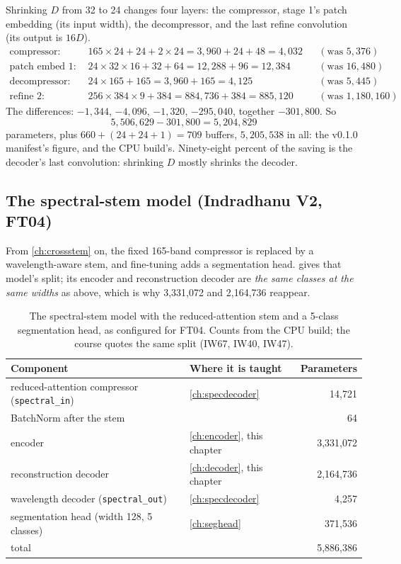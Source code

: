 Shrinking $D$ from 32 to 24 changes four layers: the compressor, stage 1's patch embedding (its input
width), the decompressor, and the last refine convolution (its output is $16D$).
\begin{align*}
\text{compressor:}\quad & 165 \times 24 + 24 + 2 \times 24 = 3{,}960 + 24 + 48 = 4{,}032 && (\text{was } 5{,}376)\\
\text{patch embed 1:}\quad & 24 \times 32 \times 16 + 32 + 64 = 12{,}288 + 96 = 12{,}384 && (\text{was } 16{,}480)\\
\text{decompressor:}\quad & 24 \times 165 + 165 = 3{,}960 + 165 = 4{,}125 && (\text{was } 5{,}445)\\
\text{refine 2:}\quad & 256 \times 384 \times 9 + 384 = 884{,}736 + 384 = 885{,}120 && (\text{was } 1{,}180{,}160)
\end{align*}
The differences: $-1{,}344$, $-4{,}096$, $-1{,}320$, $-295{,}040$, together $-301{,}800$. So
\[
5{,}506{,}629 - 301{,}800 = 5{,}204{,}829
\]
parameters, plus $660 + (24 + 24 + 1) = 709$ buffers, $5{,}205{,}538$ in all: the v0.1.0 manifest's
figure, and the CPU build's. Ninety-eight percent of the saving is the decoder's last convolution:
shrinking $D$ mostly shrinks the decoder.

\subsection{The spectral-stem model (Indradhanu V2, FT04)}

From \cref{ch:crossstem} on, the fixed 165-band compressor is replaced by a wavelength-aware stem, and
fine-tuning adds a segmentation head.  gives that model's split; its encoder and
reconstruction decoder are \emph{the same classes at the same widths} as above, which is why
3,331,072 and 2,164,736 reappear.

\begin{table}[htbp]\centering
\caption{The spectral-stem model with the reduced-attention stem and a 5-class segmentation head, as
configured for FT04.
Counts from the CPU build; the course quotes
the same split (IW67, IW40, IW47).}\label{tab:params:stem}
\begin{tabular}{@{}llr@{}}\toprule
Component & Where it is taught & Parameters \\\midrule
reduced-attention compressor (\texttt{spectral\_in}) & \cref{ch:specdecoder} & 14,721 \\
BatchNorm after the stem & & 64 \\
encoder & \cref{ch:encoder}, this chapter & 3,331,072 \\
reconstruction decoder & \cref{ch:decoder}, this chapter & 2,164,736 \\
wavelength decoder (\texttt{spectral\_out}) & \cref{ch:specdecoder} & 4,257 \\
segmentation head (width 128, 5 classes) & \cref{ch:seghead} & 371,536 \\\midrule
total & & 5,886,386 \\\bottomrule
\end{tabular}
\end{table}

